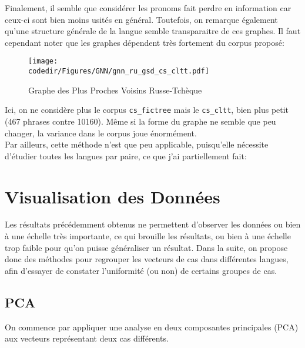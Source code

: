     Finalement, il semble que considérer les pronoms fait perdre en information car ceux-ci sont bien moins usités en général. Toutefois, on remarque également qu'une structure générale de la langue semble transparaitre de ces graphes.
    Il faut cependant noter que les graphes dépendent très fortement du corpus proposé:
    \begin{figure}[H]
	    \centering
	    \texttt{[image: \\codedir/Figures/GNN/gnn\_ru\_gsd\_cs\_cltt.pdf]}
	    \caption{Graphe des Plus Proches Voisins Russe-Tchèque}
    \end{figure}
    Ici, on ne considère plus le corpus \texttt{cs\_fictree} mais le \texttt{cs\_cltt}, bien plus petit (467 phrases contre 10160).
    Même si la forme du graphe ne semble que peu changer, la variance dans le corpus joue énormément.\\
    Par ailleurs, cette méthode n'est que peu applicable, puisqu'elle nécessite d'étudier toutes les langues par paire, ce que j'ai partiellement fait: %

\section{Visualisation des Données}
Les résultats précédemment obtenus ne permettent d'observer les données ou bien à une échelle très importante, ce qui brouille les résultats, ou bien à une échelle trop faible pour qu'on puisse généraliser un résultat.
Dans la suite, on propose donc des méthodes pour regrouper les vecteurs de cas dans différentes langues, afin d'essayer de constater l'uniformité (ou non) de certains groupes de cas.

\subsection{PCA}
On commence par appliquer une analyse en deux composantes principales (PCA) aux vecteurs représentant deux cas différents.

